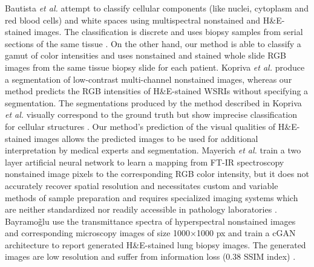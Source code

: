 \documentclass[10pt, conference, compsocconf]{IEEEtran}
\begin{document}
Bautista \textit{et al.} attempt to classify cellular components (like nuclei, cytoplasm and red blood cells) and white spaces using multispectral nonstained and H\&E-stained images. The classification is discrete and uses biopsy samples from serial sections of the same tissue \cite{bautista}. On the other hand, our method is able to classify a gamut of color intensities and uses nonstained and stained whole slide RGB images from the same tissue biopsy slide for each patient. Kopriva \textit{et al.} produce a segmentation of low-contrast multi-channel nonstained images, whereas our method predicts the RGB intensities of H\&E-stained WSRIs without specifying a segmentation. The segmentations produced by the method described in Kopriva \textit{et al.} visually correspond to the ground truth but show imprecise classification for cellular structures \cite{kopriva2015unsupervised}. Our method's prediction of the visual qualities of H\&E-stained images allows the predicted images to be used for additional interpretation by medical experts and segmentation. Mayerich \textit{et al.} train a two layer artificial neural network to learn a mapping from FT-IR spectroscopy nonstained image pixels to the corresponding RGB color intensity, but it does not accurately recover spatial resolution and necessitates custom and variable methods of sample preparation and requires specialized imaging systems which are neither standardized nor readily accessible in pathology laboratories \cite{mayerich2015stain}. Bayramo\~glu use the transmittance spectra of hyperspectral nonstained images and corresponding microscopy images of size 1000$\times$1000 px and train a cGAN architecture to report generated H\&E-stained lung biopsy images. The generated images are low resolution and suffer from information loss (0.38 SSIM index) \cite{bayramoglu}.
\end{document}
